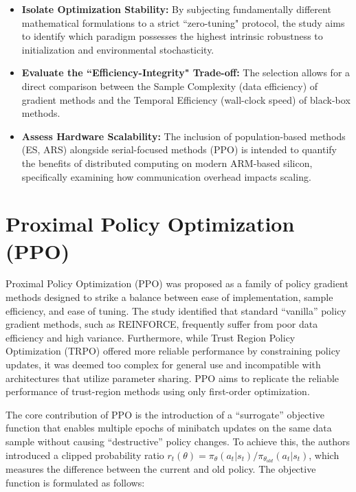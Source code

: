 \begin{itemize}
    \item \textbf{Isolate Optimization Stability:} By subjecting fundamentally different mathematical formulations to a strict ``zero-tuning" protocol, the study aims to identify which paradigm possesses the highest intrinsic robustness to initialization and environmental stochasticity.
    
    \item \textbf{Evaluate the ``Efficiency-Integrity" Trade-off:} The selection allows for a direct comparison between the Sample Complexity (data efficiency) of gradient methods and the Temporal Efficiency (wall-clock speed) of black-box methods.
    
    \item \textbf{Assess Hardware Scalability:} The inclusion of population-based methods (ES, ARS) alongside serial-focused methods (PPO) is intended to quantify the benefits of distributed computing on modern ARM-based silicon, specifically examining how communication overhead impacts scaling.
\end{itemize}

\section{Proximal Policy Optimization (PPO)}

Proximal Policy Optimization (PPO) \citep{schulman2017ppo} was proposed as a family of policy gradient methods designed to strike a balance between ease of implementation, sample efficiency, and ease of tuning. The study identified that standard ``vanilla'' policy gradient methods, such as REINFORCE, frequently suffer from poor data efficiency and high variance. Furthermore, while Trust Region Policy Optimization (TRPO) \citep{schulman2015trpo} offered more reliable performance by constraining policy updates, it was deemed too complex for general use and incompatible with architectures that utilize parameter sharing. PPO aims to replicate the reliable performance of trust-region methods using only first-order optimization.

The core contribution of PPO is the introduction of a ``surrogate'' objective function that enables multiple epochs of minibatch updates on the same data sample without causing ``destructive'' policy changes. To achieve this, the authors introduced a clipped probability ratio $r_t(\theta) = \pi_\theta(a_t | s_t) / \pi_{\theta_{old}}(a_t | s_t)$, which measures the difference between the current and old policy. The objective function is formulated as follows:

